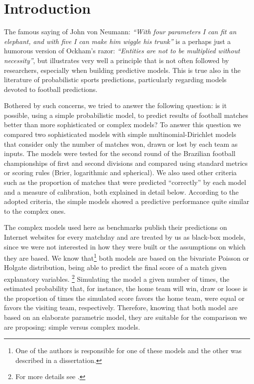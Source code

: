 \documentclass[journal,article,accept,moreauthors,pdftex,12pt,a4paper]{mdpi}
\begin{document}

\section{Introduction}

The famous saying of John von Neumann: {\it ``With four parameters I can fit an elephant, and with five I can make him wiggle his trunk''} is a perhaps just a humorous version of Ockham's razor: 
{\it``Entities are not to be multiplied without necessity''}, but illustrates very well a principle that is not often followed by researchers, especially when building predictive models. 
This is true also in the literature of probabilistic sports predictions, particularly regarding models devoted to football predictions.

Bothered by such concerns, we tried to answer the following question: is it possible, using a simple probabilistic model, to predict results of football matches better than more sophisticated or complex models?
To answer this question we compared two sophisticated models with simple multinomial-Dirichlet models that consider only the number of matches won, drawn or lost by each team as inputs.
The models were tested for the second round of the Brazilian football championships of first and second divisions and compared using standard metrics or scoring rules (Brier, logarithmic and spherical).
We also used other criteria such as the proportion of matches that were predicted ``correctly'' by each model and a measure of calibration, both explained in detail below.
According to the adopted criteria, the simple models showed a predictive performance quite similar to the complex ones.

The complex models used here as benchmarks publish their predictions on Internet websites for every matchday and are treated by us as black-box models, since we were not interested in how they were built or the assumptions on which they are based.
We know that\footnote{One of the authors is responsible for one of these models and the other was described in a dissertation.} both models are based on the bivariate Poisson or Holgate distribution, being able to predict the final score of a match given explanatory variables.
\footnote{For more details see \cite{arruda2000}.}
Simulating the model a given number of times, the estimated probability that, for instance, the home team will win, draw or loose is the proportion of times the simulated score favors the home team, were equal or favors the visiting team, respectively.
Therefore, knowing that both model are based on an elaborate parametric model, they are suitable for the comparison we are proposing: simple versus complex models.
\end{document}
